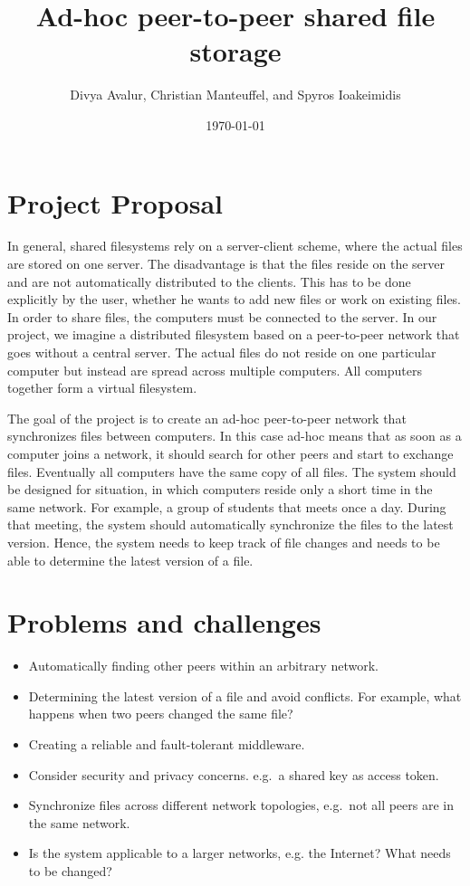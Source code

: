 \documentclass[a4paper, 11pt]{scrartcl}                %
\title{\Large Ad-hoc peer-to-peer shared file storage}
\author{\small Divya Avalur, Christian Manteuffel, and Spyros Ioakeimidis}
\date{\small \today}
\begin{document}
\maketitle

\section{Project Proposal}

In general, shared filesystems rely on a server-client scheme, where the actual files are stored on one server. 
The disadvantage is that the files reside on the server and are not automatically distributed to the clients. This has to be done explicitly by the user, whether he wants to add new files or work on existing files.
In order to share files, the computers must be connected to the server.
In our project, we imagine a distributed filesystem based on a peer-to-peer network that goes without a central server. 
The actual files do not reside on one particular computer but instead are spread across multiple computers. All computers together form a virtual filesystem.

The goal of the project is to create an ad-hoc peer-to-peer network that synchronizes files between  computers. In this case ad-hoc means that as soon as a computer joins a network, it should search for other peers and start to exchange files. Eventually all computers have the same copy of all files. 
The system should be designed for situation, in which computers reside only a short time in the same network. For example, a group of students that meets once a day. During that meeting, the system should automatically synchronize the files to the latest version. 
Hence, the system needs to keep track of file changes and needs to be able to determine the latest version of a file. 

\section{Problems and challenges}

\begin{itemize}
    \setlength{\itemsep}{0pt} \setlength{\parskip}{0pt}

	\item Automatically finding other peers within an arbitrary network.
	\item Determining the latest version of a file and avoid conflicts.  For example, what happens when two peers changed the same file?
	\item Creating a reliable and fault-tolerant middleware.
	\item Consider security and privacy concerns. e.g.\ a shared key as access token. 
	\item Synchronize files across different network topologies, e.g.\ not all peers are in the same network.
	 \item Is the system applicable to a larger networks, e.g.  the Internet? What needs to be changed? 
\end{itemize}
\end{document}
